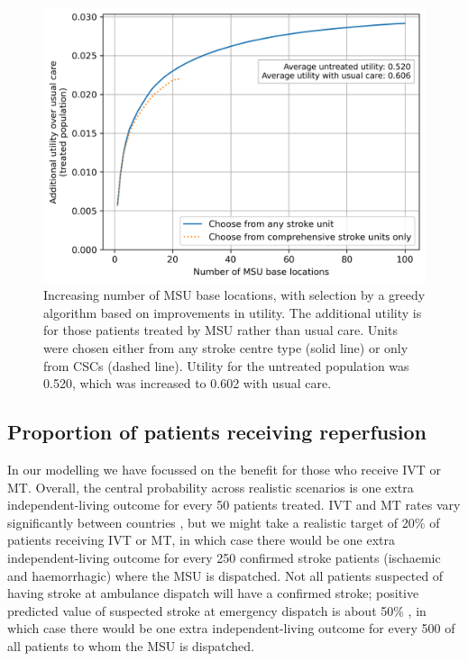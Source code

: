 \begin{figure}[h]
    \centering
    \includegraphics[width=0.5\linewidth]{images/msu_advantages_greedy.png}
    \caption{Increasing number of MSU base locations, with selection by a greedy algorithm based on improvements in utility. The additional utility is for those patients treated by MSU rather than usual care. Units were chosen either from any stroke centre type (solid line) or only from CSCs (dashed line). Utility for the untreated population was 0.520, which was increased to 0.602 with usual care.}
    \label{fig:greedy}
\end{figure}

\subsection{Proportion of patients receiving reperfusion}

In our modelling we have focussed on the benefit for those who receive IVT or MT. Overall, the central probability across realistic scenarios is one extra independent-living outcome for every 50 patients treated. IVT and MT rates vary significantly between countries \cite{kim_global_2024}, but we might take a realistic target of 20\% of patients receiving IVT or MT, in which case there would be one extra independent-living outcome for every 250 confirmed stroke patients (ischaemic and haemorrhagic) where the MSU is dispatched. Not all patients suspected of having stroke at ambulance dispatch will have a confirmed stroke; positive predicted value of suspected stroke at emergency dispatch is about 50\% \cite{kim_global_2024}, in which case there would be one extra independent-living outcome for every 500 of all patients to whom the MSU is dispatched.
